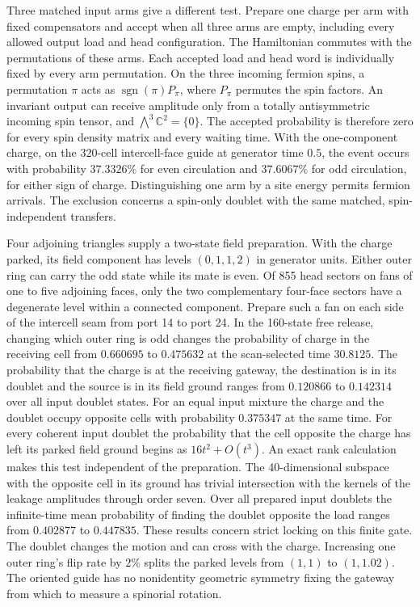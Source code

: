 Three matched input arms give a different test. Prepare one charge per
arm with fixed compensators and accept when all three arms are empty,
including every allowed output load and head configuration. The
Hamiltonian commutes with the permutations of these arms. Each accepted
load and head word is individually fixed by every arm permutation.
On the three incoming fermion spins, a permutation $\pi$ acts as
$\operatorname{sgn}(\pi)P_\pi$, where $P_\pi$ permutes the spin factors.
An invariant output can receive amplitude only from a totally
antisymmetric incoming spin tensor, and
$\bigwedge^3\mathbb C^2=\{0\}$. The accepted probability is therefore
zero for every spin density matrix and every waiting time. With the
one-component charge, on the 320-cell intercell-face guide at generator
time $0.5$, the event occurs with probability $37.3326\%$ for even
circulation and $37.6067\%$ for odd circulation, for either sign of
charge. Distinguishing one arm by a site energy permits fermion arrivals.
The exclusion concerns a spin-only doublet with the same matched,
spin-independent transfers.

Four adjoining triangles supply a two-state field preparation. With
the charge parked, its field component has levels $(0,1,1,2)$ in generator
units. Either outer ring can carry the odd state while its mate is even.
Of 855 head sectors on fans of one to five adjoining faces, only the two
complementary four-face sectors have a degenerate level within a connected
component. Prepare such a fan on each side of the intercell seam from
port 14 to port 24. In the 160-state free release, changing which outer
ring is odd changes the probability of charge in the receiving cell
from $0.660695$ to $0.475632$ at the scan-selected time $30.8125$.
The probability that the charge is at the receiving gateway, the
destination is in its doublet and the source is in its field ground
ranges from $0.120866$ to $0.142314$ over all input doublet states.
For an equal input mixture the charge and the doublet occupy opposite
cells with probability $0.375347$ at the same time. For every coherent
input doublet the probability that the cell opposite the charge has left
its parked field ground begins as $16t^2+O(t^3)$. An exact rank
calculation makes this test independent of the preparation. The
40-dimensional subspace with the opposite cell in its ground has
trivial intersection with the kernels of the leakage amplitudes through
order seven. Over all prepared input doublets the infinite-time mean
probability of finding the doublet opposite the load ranges from
$0.402877$ to $0.447835$. These results concern strict locking on this
finite gate. The doublet changes
the motion and can cross with the charge. Increasing one outer ring's
flip rate by $2\%$ splits the parked levels from $(1,1)$ to $(1,1.02)$.
The oriented guide has no nonidentity geometric symmetry fixing the
gateway from which to measure a spinorial rotation.

